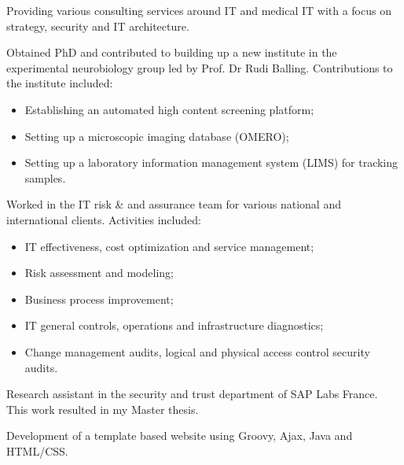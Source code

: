 \documentclass[11pt,a4paper,nolmodern,sans]{moderncv}        %
\begin{document}
{Providing various consulting services around IT and medical IT with a focus on strategy, security and IT architecture.}



{Obtained PhD and contributed to building up a new institute in the experimental neurobiology group led by Prof. Dr Rudi Balling. \newline{} Contributions to the institute included:
\begin{itemize}%
	\item Establishing an automated high content screening platform;
	\item Setting up a microscopic imaging database (OMERO);
	\item Setting up a laboratory information management system (LIMS) for tracking samples.
\end{itemize}}


{Worked in the IT risk \& and assurance team for various national and international clients. \newline{} Activities included:
\begin{itemize}
	\item IT effectiveness, cost optimization and service management;
	\item Risk assessment and modeling;
	\item Business process improvement;
	\item IT general controls, operations and infrastructure diagnostics;
	\item Change management audits, logical and physical access control security audits.
\end{itemize}}


{Research assistant in the security and trust department of SAP Labs France. This work resulted in my Master thesis.}

{Development of a template based website using Groovy, Ajax, Java and HTML/CSS.}{}
\end{document}
